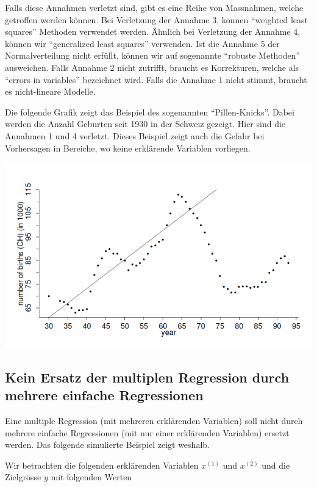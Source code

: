 \documentclass[]{book}
\begin{document}
Falls diese Annahmen verletzt sind, gibt es eine Reihe von Massnahmen,
welche getroffen werden können. Bei Verletzung der Annahme 3, können
``weighted least squares'' Methoden verwendet werden. Ähnlich bei
Verletzung der Annahme 4, können wir ``generalized least squares''
verwenden. Ist die Annahme 5 der Normalverteilung nicht erfüllt, können
wir auf sogenannte ``robuste Methoden'' ausweichen. Falls Annahme 2
nicht zutrifft, braucht es Korrekturen, welche als ``errors in
variables'' bezeichnet wird. Falls die Annahme 1 nicht stimmt, braucht
es nicht-lineare Modelle.

Die folgende Grafik zeigt das Beispiel des sogenannten
``Pillen-Knicks''. Dabei werden die Anzahl Geburten seit 1930 in der
Schweiz gezeigt. Hier sind die Annahmen 1 und 4 verletzt. Dieses
Beispiel zeigt auch die Gefahr bei Vorhersagen in Bereiche, wo keine
erklärende Variablen vorliegen.

\begin{center}\includegraphics{PillKink} \end{center}

\subsection{Kein Ersatz der multiplen Regression durch mehrere einfache
Regressionen}\label{kein-ersatz-der-multiplen-regression-durch-mehrere-einfache-regressionen}

Eine multiple Regression (mit mehreren erklärenden Variablen) soll nicht
durch mehrere einfache Regressionen (mit nur einer erklärenden
Variablen) ersetzt werden. Das folgende simulierte Beispiel zeigt
weshalb.

Wir betrachten die folgenden erklärenden Variablen \(x^{(1)}\) und
\(x^{(2)}\) und die Zielgrösse \(y\) mit folgenden Werten
\end{document}
